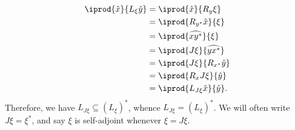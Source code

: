 \documentclass[10pt]{mypackage}
\begin{document}
\begin{align*}
  \iprod{\hat{x}}{L_{\xi}\hat{y}} &= \iprod{\hat{x}}{R_y\xi}\\
                                  &= \iprod{R_{y^{\ast}}\hat{x}}{\xi}\\
                                  &= \iprod{\widehat{xy^{\ast}}}{\xi}\\
                                  &= \iprod{J\xi}{\widehat{yx^{\ast}}}\\
                                  &= \iprod{J\xi}{R_{x^{\ast}}\hat{y}}\\
                                  &= \iprod{R_xJ\xi}{\hat{y}}\\
                                  &= \iprod{L_{J\xi}\hat{x}}{\hat{y}}.
\end{align*}
Therefore, we have $L_{J\xi}\subseteq \left( L_{\xi} \right)^{\ast}$, whence $L_{J\xi} = \left( L_{\xi} \right)^{\ast}$. We will often write $J\xi = \xi^{\ast}$, and say $\xi$ is self-adjoint whenever $\xi = J\xi$.
\end{document}
